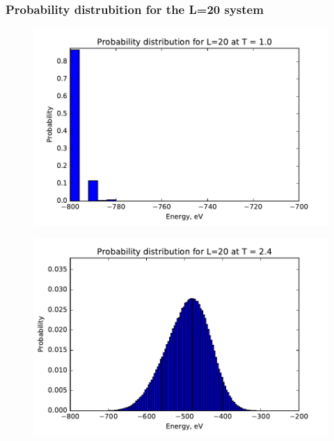 \subsubsection{Probability distrubition  for the L=20 system}



\begin{figure}[H]
	\centering
	\includegraphics[width=0.7\linewidth]{../results/4d/PD_T_1MC_1e6}
	\caption{}
	\label{fig:pdt1}
\end{figure}

\begin{figure}[H]
	\centering
	\includegraphics[width=0.7\linewidth]{../results/4d/PD_T_2MC_1e6}
	\caption{}
	\label{fig:pdt2_4}
\end{figure}



